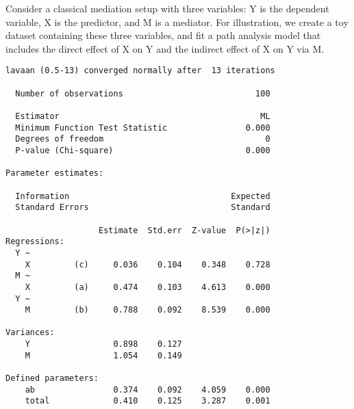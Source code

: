 Consider a classical mediation setup with three variables: Y is the
dependent variable, X is the predictor, and M is a mediator. For
illustration, we create a toy dataset containing these three variables,
and fit a path analysis model that includes the direct effect of X on Y
and the indirect effect of X on Y via M.

\begin{Shaded}
\begin{Highlighting}[]
\NormalTok{(}\NormalTok{)}
\StringTok{ }\NormalTok{(}\NormalTok{)}
\StringTok{ }\StringTok{ }\NormalTok{(}\NormalTok{)}
\StringTok{ }\StringTok{ }\NormalTok{(}\NormalTok{)}
\StringTok{ }\NormalTok{(}   
\StringTok{ } 
\end{Highlighting}
\end{Shaded}

\begin{verbatim}
lavaan (0.5-13) converged normally after  13 iterations

  Number of observations                           100

  Estimator                                         ML
  Minimum Function Test Statistic                0.000
  Degrees of freedom                                 0
  P-value (Chi-square)                           0.000

Parameter estimates:

  Information                                 Expected
  Standard Errors                             Standard

                   Estimate  Std.err  Z-value  P(>|z|)
Regressions:
  Y ~
    X         (c)     0.036    0.104    0.348    0.728
  M ~
    X         (a)     0.474    0.103    4.613    0.000
  Y ~
    M         (b)     0.788    0.092    8.539    0.000

Variances:
    Y                 0.898    0.127
    M                 1.054    0.149

Defined parameters:
    ab                0.374    0.092    4.059    0.000
    total             0.410    0.125    3.287    0.001
\end{verbatim}

